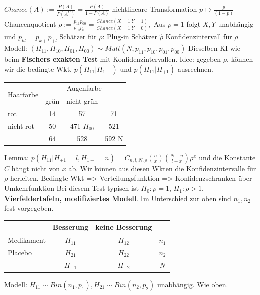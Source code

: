 \begin{outline}
    \1 $Chance(A):=\frac{P(A)}{P(A^C)}=\frac{P(A)}{1-P(A)}$
        \2 nichtlineare Transformation $p \mapsto \frac{p}{(1-p)}$
    \1 Chancenquotient $\rho:=\frac{p_{11}p_{00}}{p_{10}p_{01}}=\frac{Chance(X=1 |Y=1)}{Chance(X=1 |Y=0)},$
        \2 Aus $\rho =1$ folgt $X,Y$ unabhängig und $p_{kl}=p_{k+}p_{+l}$
    \1 Schätzer für $\rho$: Plug-in Schätzer $\hat{\rho}$
    \1 Konfidenzintervall für $\rho$
        \2 Modell: $(H_{11}, H_{10}, H_{01}, H_{00}) \sim Mult(N,p_{11},p_{10},p_{01},p_{00})$ 
    \2 Dieselben KI wie beim \textbf{Fischers exakten Test} mit Konfidenzintervallen. Idee: gegeben $\rho$, können wir die bedingte Wkt. $p(H_{11} |H_{1+})$ und $p(H_{11} |H_{+1})$ ausrechnen.\\
    \begin{tabular}{|l|c|c|c|}
    \hline
    \multicolumn{1}{|c|}{\multirow{2}{*}{Haarfarbe}} & \multicolumn{3}{c|}{Augenfarbe} \\
    \cline{2-4}
     & grün & nicht grün & \multicolumn{1}{c|}{} \\
    \hline
    rot & 14 & 57 & 71 \\
    \hline
    nicht rot & 50 & 471 $H_{00}$ & 521 \\
    \hline
     & 64 & 528 & 592 N \\
    \hline
    \end{tabular}
    \2 Lemma: $p(H_{11} |H_{+1}=l, H_{1+}=n) = C_{n,l,N,\rho}\binom{n}{x}\binom{N-n}{l-x}\rho^x$ und die Konstante $C$ hängt nicht von $x$ ab.
    \2 Wir können aus diesen Wkten die Konfidenzintervalle für $\rho$ herleiten. Bedingte Wkt => Verteilungsfunktion => Konfidenzschranken über Umkehrfunktion
    \2 Bei diesem Test typisch ist $H_0 : \rho = 1$, $H_1 : \rho > 1$.
\1 \textbf{Vierfeldertafeln, modifiziertes Modell}.
    \2 Im Unterschied zur oben sind $n_1, n_2$ fest vorgegeben.\\
    \begin{tabular}{|l|c|c|c|}
    \hline
    & Besserung & keine Besserung & \\
    \hline
    Medikament & $H_{11}$ & $H_{12}$ & $n_1$ \\
    \hline
    Placebo & $H_{21}$ & $H_{22}$ & $n_2$ \\
    \hline
    & $H_{+1}$ & $H_{+2}$ & $N$ \\
    \hline
    \end{tabular}
    \2 Modell: $H_{11}\sim Bin(n_1,p_1), H_{21}\sim Bin(n_2,p_2)$ unabhängig.
    \2 Wie oben.
\end{outline}

